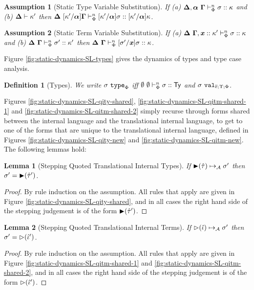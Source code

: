 \documentclass[12pt]{article}
\newtheorem{lemma}{Lemma}
\newtheorem{definition}{Definition}
\newtheorem{assumption}{Assumption}
\begin{document}
\begin{assumption}[Static Type Variable Substitution]
\label{assumption:static-type-variable-substitution}
If (a) $\boldsymbol\Delta, \boldsymbol{\alpha}~\boldsymbol\Gamma \vdash_{\Phi}^{n} \sigma :: \kappa$ and (b) ${\boldsymbol\Delta}\vdash {\kappa'}$ then $\boldsymbol\Delta~[\kappa'/\boldsymbol{\alpha}]\boldsymbol\Gamma \vdash_{\Phi}^{n} [\kappa'/\boldsymbol{\alpha}]\sigma :: [\kappa'/\boldsymbol{\alpha}]\kappa$.
\end{assumption}

\begin{assumption}[Static Term Variable Substitution]
\label{assumption:static-term-variable-substitution}
If (a) $\boldsymbol\Delta~\boldsymbol\Gamma, {\textbf{\textit{x}}} :: \kappa' \vdash_{\Phi}^{n} \sigma :: \kappa$ and (b) $\boldsymbol\Delta~\boldsymbol\Gamma \vdash_{\Phi}^{n} \sigma' :: \kappa'$ then $\boldsymbol\Delta~\boldsymbol\Gamma \vdash_{\Phi}^{n} [\sigma'/{\textbf{\textit{x}}}]\sigma :: \kappa$.
\end{assumption}

Figure \ref{fig:static-dynamics-SL-types} gives the dynamics of types and type case analysis.

\begin{definition}[Types]
\label{def:types}
We write $\sigma~\mathtt{type}_{\Phi}$ iff $\emptyset~\emptyset \vdash_{\Phi}^{n} \sigma :: {\sf Ty}$ and $\sigma~\mathtt{val}_{\overline{e};\Upsilon;\Phi}$.
\end{definition}


Figures \ref{fig:static-dynamics-SL-qity-shared}, \ref{fig:static-dynamics-SL-qitm-shared-1} and \ref{fig:static-dynamics-SL-qitm-shared-2} simply recurse through forms shared between the internal language and the translational internal language, to get to one of the forms that are unique to the translational internal language, defined in Figures \ref{fig:static-dynamics-SL-qity-new} and \ref{fig:static-dynamics-SL-qitm-new}. The following lemmas hold:

\begin{lemma}[Stepping Quoted Translational Internal Types]
\label{lemma:stepping-quoted-translational-internal-types}
If ${\blacktriangleright}(\hat{\tau}) \mapsto_{\mathcal{A}} \sigma'$ then $\sigma'={\blacktriangleright}(\hat{\tau}')$.
\end{lemma}
\begin{proof}
By rule induction on the assumption. All rules that apply are given in Figure \ref{fig:static-dynamics-SL-qity-shared}, and in all cases the right hand side of the stepping judgement is of the form ${\blacktriangleright}(\hat{\tau}')$.
\end{proof}

\begin{lemma}[Stepping Quoted Translational Internal Terms]
\label{lemma:stepping-quoted-translational-internal-terms}
If ${\rhd}(\hat{\iota}) \mapsto_{\mathcal{A}} \sigma'$ then $\sigma'={\rhd}(\hat{\iota}')$.
\end{lemma}
\begin{proof}
By rule induction on the assumption. All rules that apply are given in Figure \ref{fig:static-dynamics-SL-qitm-shared-1} and \ref{fig:static-dynamics-SL-qitm-shared-2}, and in all cases the right hand side of the stepping judgement is of the form ${\rhd}(\hat{\iota}')$. 
\end{proof}
\end{document}

